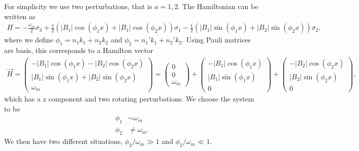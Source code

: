 \documentclass[letterpaper,12pt,english]{sphinxmanual}
\begin{document}
For simplicity we use two perturbations, that is \(a=1,2\). The Hamiltonian can be written as
\begin{equation*}
\begin{split}H = -\frac{\omega_m}{2} \sigma_3 + \frac{1}{2} ( \lvert B_1\rvert \cos(\phi_1 x) + \lvert B_1 \rvert \cos (\phi_2 x) )\sigma_1 - \frac{1}{2} ( \lvert B_1 \rvert \sin (\phi_1 x) + \lvert B_2 \rvert \sin(\phi_2x) ) \sigma_2,\end{split}
\end{equation*}
where we define \(\phi_1 = n_1 k_1 + n_2 k_2\) and \(\phi_2 = n_1' k_1 + n_2' k_2\). Using Pauli matrices are basis, this corresponds to a Hamilton vector
\begin{equation*}
\begin{split}\vec H = \begin{pmatrix}
- \lvert B_1\rvert \cos(\phi_1 x) - \lvert B_2 \rvert \cos (\phi_2 x)  \\
\lvert B_1 \rvert \sin (\phi_1 x) + \lvert B_2 \rvert \sin(\phi_2x) \\
\omega_m
\end{pmatrix} = \begin{pmatrix}
0  \\
0 \\
\omega_m
\end{pmatrix} + \begin{pmatrix}
- \lvert B_1\rvert \cos(\phi_1 x)   \\
\lvert B_1 \rvert \sin (\phi_1 x)  \\
0
\end{pmatrix} + \begin{pmatrix}
- \lvert B_2 \rvert \cos (\phi_2 x)  \\
\lvert B_2 \rvert \sin(\phi_2x) \\
0
\end{pmatrix},\end{split}
\end{equation*}
which has a z component and two rotating perturbations. We choose the system to be
\begin{equation*}
\begin{split}\phi_1 &\sim \omega_m \\
\phi_2 & \neq \omega_m.\end{split}
\end{equation*}
We then have two different situations, \(\phi_2/\omega_m \gg 1\) and \(\phi_2/\omega_m \ll 1\).
\end{document}
